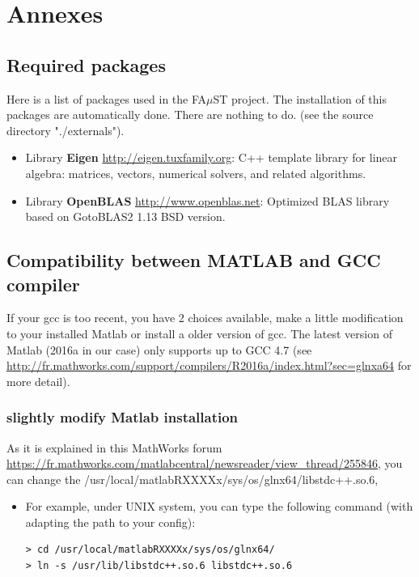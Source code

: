 \chapter{Annexes}\label{sec:Annexes}

\section{Required packages}\label{sec:ANNEXERequiredPackages}
Here is a list of packages used in the FA$\mu$ST project. The installation of this packages are automatically done. There are nothing to do. (see the source directory "./externals").
\begin{itemize}
\item Library \textbf{Eigen} \url{http://eigen.tuxfamily.org}: C++ template library for linear algebra: matrices, vectors, numerical solvers, and related algorithms.
\item Library \textbf{OpenBLAS} \url{http://www.openblas.net}:  Optimized BLAS library based on GotoBLAS2 1.13 BSD version.
\end{itemize}

\section{Compatibility between MATLAB and GCC compiler}\label{sec:ANNEXECompatibilityMatlabCompiler}
If your gcc is too recent,
you have 2 choices available, make a little modification to your installed Matlab or install a older version of gcc.
The latest version of Matlab (2016a in our case) only supports up to GCC 4.7 (see \url{http://fr.mathworks.com/support/compilers/R2016a/index.html?sec=glnxa64} for more detail).

\subsection{slightly modify Matlab installation}
  As it is explained in this MathWorks forum \url{https://fr.mathworks.com/matlabcentral/newsreader/view_thread/255846}, you can change the /usr/local/matlabRXXXXx/sys/os/glnx64/libstdc++.so.6,
\begin{itemize}
\item For example, under UNIX system, you can type the following command (with adapting the path to your config):
\begin{lstlisting}
> cd /usr/local/matlabRXXXXx/sys/os/glnx64/
> ln -s /usr/lib/libstdc++.so.6 libstdc++.so.6
\end{lstlisting} 
\end{itemize}





